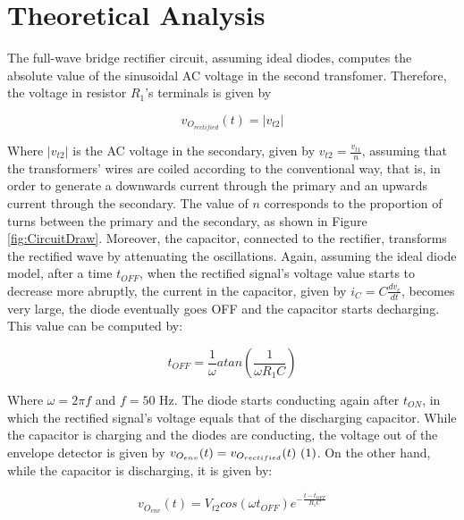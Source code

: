\section{Theoretical Analysis} \label{sec:analysis}

The full-wave bridge rectifier circuit, assuming ideal diodes, computes the absolute value of the sinusoidal AC voltage in the second transfomer. Therefore, the voltage in resistor $R_1$'s terminals is given by

\begin{equation} \label{eq:rectified_voltage}
  v_{O_{rectified}}(t)=|v_{t2}|
\end{equation}

Where $|v_{t2}|$ is the AC voltage in the secondary, given by $v_{t2}=\frac{v_{t1}}{n}$, assuming that the transformers' wires are coiled according to the conventional way, that is, in order to generate a downwards current through the primary and an upwards current through the secondary. The value of $n$ corresponds to the proportion of turns between the primary and the secondary, as shown in Figure \ref{fig:CircuitDraw}. Moreover, the capacitor, connected to the rectifier, transforms the rectified wave by attenuating the oscillations. Again, assuming the ideal diode model, after a time $t_{OFF}$, when the rectified signal's voltage value starts to decrease more abruptly, the current in the capacitor, given by $i_C=C\frac{dv_c}{dt}$, becomes very large, the diode eventually goes OFF and the capacitor starts decharging. This value can be computed by:

\begin{equation} \label{eq:toff}
  t_{OFF}=\frac{1}{\omega}atan\left(\frac{1}{\omega R_1C}\right)
\end{equation}

Where $\omega=2\pi f$ and $f=50$ Hz. The diode starts conducting again after $t_{ON}$, in which the rectified signal's voltage equals that of the discharging capacitor. While the capacitor is charging and the diodes are conducting, the voltage out of the envelope detector is given by $v_{O_{env}}(t)=v_{O_{rectified}}(t)~\refstepcounter{equation}(\theequation)\label{eq:envelopesameasrectified}$. On the other hand, while the capacitor is discharging, it is given by:

\begin{equation} \label{eq:exponential_voltage}
  v_{O_{env}}(t)=V_{t2}cos(\omega t_{OFF})e^{-\frac{t-t_{OFF}}{R_1C}}
\end{equation}

